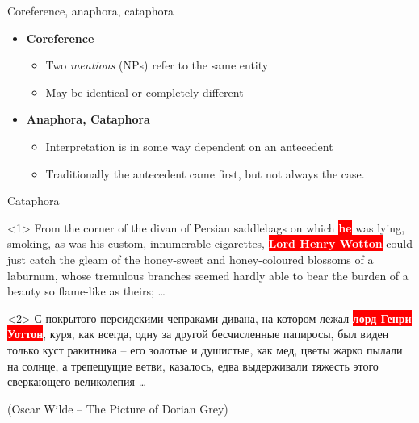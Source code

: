 \documentclass[dvipsnames, 10pt, compress]{beamer}
\newcommand{\redfillbox}[1]{\colorbox{red}{\textcolor{white}{{\bf #1}}}}
\begin{document}
\begin{frame}{Coreference, anaphora, cataphora}

\begin{itemize}
  \item  \textbf{Coreference} 
  \begin{itemize}  
    \item Two \emph{mentions} (NPs) refer to the same entity 
    \item May be identical or completely different
  \end{itemize}
  \item \textbf{Anaphora, Cataphora} 
  \begin{itemize}
    \item Interpretation is in some way dependent on an antecedent
    \item Traditionally the antecedent came first, but not always the case.
  \end{itemize}
\end{itemize}

\end{frame}


\begin{frame}{Cataphora}

\begin{onlyenv}<1>
From the corner of the divan of Persian saddlebags on which \redfillbox{he} was lying, smoking, as was his custom, innumerable cigarettes, \redfillbox{Lord Henry Wotton} could just catch the gleam of the honey-sweet and honey-coloured blossoms of a laburnum, whose tremulous branches seemed hardly able to bear the burden of a beauty so flame-like as theirs; \ldots
\end{onlyenv}
\begin{onlyenv}<2>
 С покрытого персидскими чепраками дивана, на котором лежал \redfillbox{лорд Генри Уоттон}, куря, как всегда, одну за другой бесчисленные папиросы, был виден только куст ракитника -- его золотые и душистые, как мед, цветы жарко пылали на солнце, а трепещущие ветви, казалось, едва выдерживали тяжесть этого сверкающего великолепия \ldots
\end{onlyenv}

(Oscar Wilde -- The Picture of Dorian Grey)
%

\end{frame}
\end{document}
